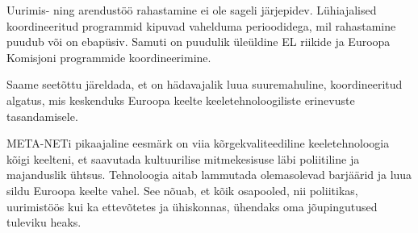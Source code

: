 \documentclass[]{../metanetpaper}
\begin{document}
\begin{multicols}{2}
Uurimis- ning arendustöö rahastamine ei ole sageli järjepidev. 
Lühiajalised koordineeritud programmid kipuvad vahelduma perioodidega, mil rahastamine puudub või on ebapüsiv. 
Samuti on puudulik üleüldine EL riikide ja Euroopa Komisjoni  programmide koordineerimine.

Saame seetõttu järeldada, et on hädavajalik luua suuremahuline, koordineeritud algatus, mis keskenduks Euroopa keelte keeletehnoloogiliste erinevuste tasandamisele.

META-NETi pikaajaline eesmärk on viia kõrgekvaliteediline keeletehnoloogia kõigi keelteni, et saavutada kultuurilise mitmekesisuse läbi poliitiline ja majanduslik ühtsus. 
Tehnoloogia aitab lammutada olemasolevad barjäärid ja luua sildu Euroopa keelte vahel. 
See nõuab, et kõik osapooled, nii poliitikas, uurimistöös kui ka ettevõtetes ja ühiskonnas, ühendaks oma jõupingutused tuleviku heaks.

\end{multicols}

\cleardoublepage


\end{document}
